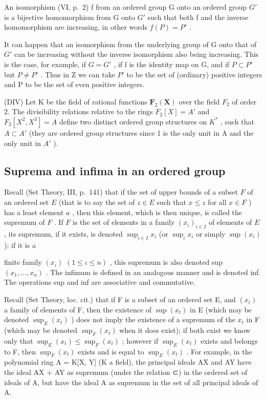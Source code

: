An isomorphism (VI, p.~2) f from an ordered group G onto an ordered group \(G'\) is a bijective homomorphism from G onto \(G'\) such that both f and the inverse homomorphism are increasing, in other words \(f(P) = P'\) .

It can happen that an isomorphism from the underlying group of G onto that of \(G'\) can be increasing without the inverse isomorphism also being increasing. This is the case, for example, if \(G = G'\) , if f is the identity map on G, and if \(P \subset P'\) but \(P \neq P'\) . Thus in Z we can take \(P'\) to be the set of (ordinary) positive integers and P to be the set of even positive integers.

(DIV) Let K be the field of rational functions \(\mathbf{F}_{2}(\mathbf{X})\) over the field \(F_{2}\) of order 2. The divisibility relations relative to the rings \(F_{2}[X] = A'\) and \(F_{2}[X^{2}, X^{3}] = A\) define two distinct ordered group structures on \(K^{*}\) , such that \(A \subset A'\) (they are ordered group structures since 1 is the only unit in A and the only unit in \(A'\) ).

\subsection{Suprema and infima in an ordered group}

Recall (Set Theory, III, p.~141) that if the set of upper bounds of a subset \(F\) of an ordered set \(E\) (that is to say the set of \(z \in E\) such that \(x \leqslant z\) for all \(x \in F\) ) has a least element \(a\) , then this element, which is then unique, is called the supremum of \(F\) . If \(F\) is the set of elements in a family \((x_{i})_{i \in I}\) of elements of \(E\) , its supremum, if it exists, is denoted \(\sup_{i \in I} x_i\) (or \(\sup_{i} x_i\) or simply \(\sup(x_i)\) ); if it is a

finite family \((x_{\iota})\) \((1 \leqslant \iota \leqslant n)\) , this supremum is also denoted sup \((x_{1}, \ldots, x_{n})\) . The infimum is defined in an analogous manner and is denoted inf. The operations sup and inf are associative and commutative.

Recall (Set Theory, loc. cit.) that if F is a subset of an ordered set E, and \((x_{t})\) a family of elements of F, then the existence of \(\sup(x_{t})\) in E (which may be denoted \(\sup_{E}(x_{t})\) ) does not imply the existence of a supremum of the \(x_{t}\) in F (which may be denoted \(\sup_{F}(x_{t})\) when it does exist); if both exist we know only that \(\sup_{E}(x_{t}) \leqslant \sup_{F}(x_{t})\) ; however if \(\sup_{E}(x_{t})\) exists and belongs to F, then \(\sup_{F}(x_{t})\) exists and is equal to \(\sup_{E}(x_{t})\) . For example, in the polynomial ring A = K{[}X, Y{]} (K a field), the principal ideals AX and AY have the ideal AX + AY as supremum (under the relation ⊂) in the ordered set of ideals of A, but have the ideal A as supremum in the set of all principal ideals of A.

